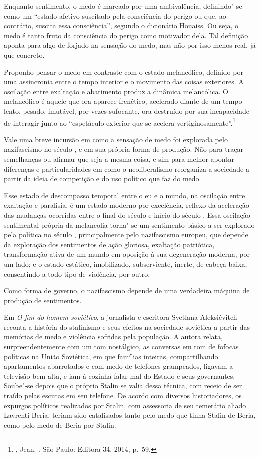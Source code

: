 Enquanto sentimento, o medo é marcado por uma ambivalência,
definindo"-se como um ``estado afetivo suscitado pela consciência do
perigo ou que, ao contrário, suscita essa consciência'', segundo
o dicionário Houaiss. Ou seja, o medo é tanto fruto da
consciência do perigo como motivador dela. Tal definição aponta para
algo de forjado na sensação do medo, mas não por isso
menos real, já que concreto.

Proponho pensar o medo em contraste
com o estado melancólico, definido por uma
assincronia entre o tempo interior e o movimento das coisas exteriores.
A oscilação entre exaltação e abatimento produz a dinâmica melancólica.
O melancólico é aquele que ora aparece frenético, acelerado diante de um
tempo lento, pesado, imutável, por vezes sufocante, ora destruído por
sua incapacidade de interagir junto ao ``espetáculo exterior que se
acelera vertiginosamente''.\footnote{, Jean. {}. São Paulo: Editora 34, 2014, p.~59.}

Vale uma breve incursão em como a sensação de medo foi explorada pelo nazifascismo no século , e em sua própria forma de produção. Não para traçar semelhanças ou afirmar que seja a mesma coisa, e sim para melhor apontar diferenças e particularidades em como o neoliberalismo reorganiza a sociedade a partir da ideia de competição e do uso político que faz do medo.

Esse estado de descompasso temporal entre o eu e o mundo, na oscilação
entre exaltação e paralisia, é um estado moderno por excelência,
reflexo da aceleração das
mudanças ocorridas entre o final do século  e início do século .
Essa oscilação sentimental própria da melancolia torna"-se um sentimento
básico a ser explorado pela política no século , principalmente pelo
nazifascismo europeu, que depende da exploração dos sentimentos de ação
gloriosa, exaltação patriótica, transformação ativa de um mundo em
oposição à sua degeneração moderna, por um lado; e o estado estático,
imobilizado, subserviente, inerte, de cabeça baixa, consentindo a todo
tipo de violência, por outro.

Como forma de governo, o nazifascismo depende de uma verdadeira máquina
de produção de sentimentos.

\asterisc

Em \emph{O fim do homem soviético}, a jornalista e escritora Svetlana
Aleksiévitch reconta a história do stalinismo e seus efeitos na sociedade
soviética a partir das memórias de medo e violência sofridas pela
população. A autora relata, surpreendentemente com um tom nostálgico, as
conversas em tom de fofocas políticas na União Soviética, em que
famílias inteiras, compartilhando apartamentos abarrotados e com medo de
telefones grampeados, ligavam a televisão bem alta, e iam à cozinha
falar mal do Estado e seus governantes. Soube"-se depois que o próprio Stalin se valia dessa
técnica, com receio de ser traído pelas escutas em seu telefone. De
acordo com diversos historiadores, os expurgos políticos realizados por
Stalin, com assessoria de seu temerário aliado Lavrenti Beria, teriam
sido catalisados tanto pelo medo que tinha Stalin de Beria, como pelo
medo de Beria por Stalin.


